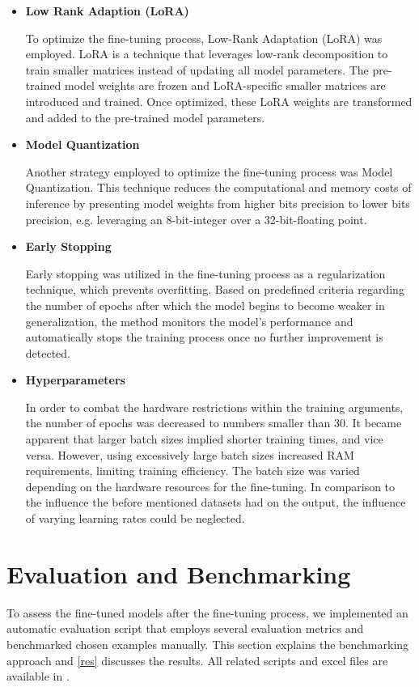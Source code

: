 \documentclass[conference]{IEEEtran}
\begin{document}
\begin{itemize}
    \item \textbf{Low Rank Adaption (LoRA)} 
        
        To optimize the fine-tuning process, Low-Rank Adaptation (LoRA) was employed. LoRA is a technique that leverages low-rank decomposition to train smaller matrices instead of updating all model parameters. The pre-trained model weights are frozen and LoRA-specific smaller matrices are introduced and trained. Once optimized, these LoRA weights are transformed and added to the pre-trained model parameters.   

    \item \textbf{Model Quantization}
        
        Another strategy employed to optimize the fine-tuning process was Model Quantization. This technique reduces the computational and memory costs of inference by presenting model weights from higher bits precision to lower bits precision, e.g. leveraging an 8-bit-integer over a 32-bit-floating point.

    \item \textbf{Early Stopping}

        Early stopping was utilized in the fine-tuning process as a regularization technique, which prevents overfitting. Based on predefined criteria regarding the number of epochs after which the model begins to become weaker in generalization, the method monitors the model's performance and automatically stops the training process once no further improvement is detected.
        
    \item \textbf{Hyperparameters}

        In order to combat the hardware restrictions within the training arguments, the number of epochs was decreased to numbers smaller than 30. It became apparent that larger batch sizes implied shorter training times, and vice versa. However, using excessively large batch sizes increased RAM requirements, limiting training efficiency. The batch size was varied depending on the hardware resources for the fine-tuning.
        In comparison to the influence the before mentioned datasets had on the output, the influence of varying learning rates could be neglected. 
        
   
\end{itemize}

\section{Evaluation and Benchmarking}\label{eval}
To assess the fine-tuned models after the fine-tuning process, we implemented an automatic evaluation script that employs several evaluation metrics and benchmarked chosen examples manually. 
This section explains the benchmarking approach and \ref{res} discusses the results. All related scripts and excel files are available in \cite{b1}.
\end{document}
